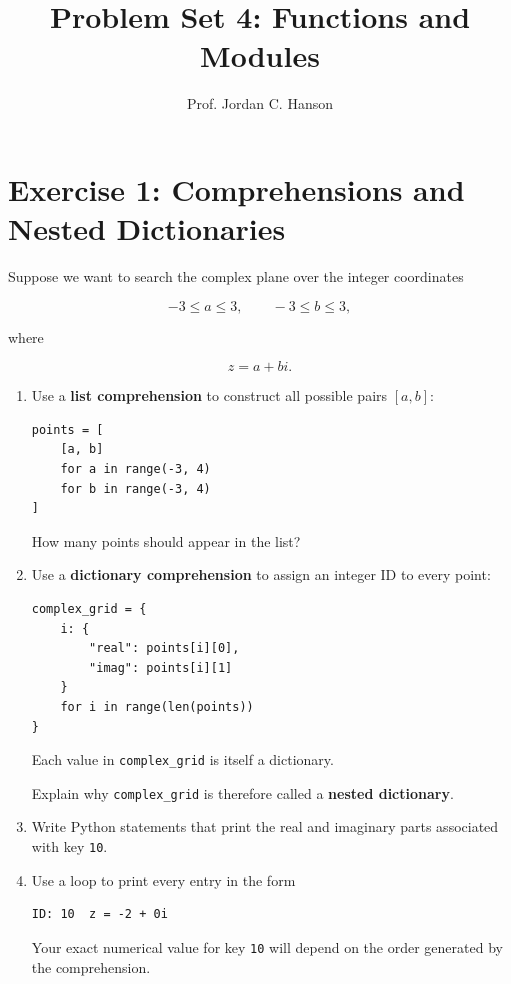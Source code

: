 \documentclass{article}
\begin{document}
\twocolumn

\title{Problem Set 4: Functions and Modules}
\author{Prof. Jordan C. Hanson}
\date{}

\maketitle

\section{Exercise 1: Comprehensions and \\ Nested Dictionaries}

Suppose we want to search the complex plane over the integer
coordinates

\[
-3 \leq a \leq 3,
\qquad
-3 \leq b \leq 3,
\]

where

\[
z=a+bi.
\]

\begin{enumerate}

\item Use a \textbf{list comprehension} to construct all possible
pairs \([a,b]\):

\begin{verbatim}
points = [
    [a, b]
    for a in range(-3, 4)
    for b in range(-3, 4)
]
\end{verbatim}

How many points should appear in the list?

\vspace{0.3cm}

\item Use a \textbf{dictionary comprehension} to assign an
integer ID to every point:

\begin{verbatim}
complex_grid = {
    i: {
        "real": points[i][0],
        "imag": points[i][1]
    }
    for i in range(len(points))
}
\end{verbatim}

Each value in \texttt{complex\_grid} is itself a dictionary.

Explain why \texttt{complex\_grid} is therefore called a
\textbf{nested dictionary}.

\vspace{0.4cm}

\item Write Python statements that print the real and imaginary
parts associated with key \texttt{10}.

\item Use a loop to print every entry in the form

\begin{verbatim}
ID: 10  z = -2 + 0i
\end{verbatim}

Your exact numerical value for key \texttt{10} will depend on
the order generated by the comprehension.

\end{enumerate}
\end{document}
